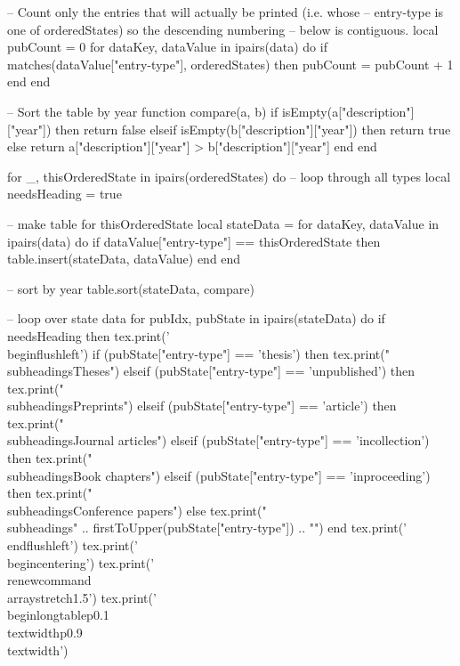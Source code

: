 \documentclass[letterpaper, 10pt]{article}
\newcommand{\subheadings}[1]{\textbf{#1} \vspace{5pt}}
\begin{document}
\begin{luacode}
		-- Count only the entries that will actually be printed (i.e. whose
		-- entry-type is one of orderedStates) so the descending numbering
		-- below is contiguous.
		local pubCount = 0
		for dataKey, dataValue in ipairs(data) do
			if matches(dataValue["entry-type"], orderedStates) then
				pubCount = pubCount + 1
			end
		end

		-- Sort the table by year
		function compare(a, b)
			if isEmpty(a["description"]["year"]) then
				return false
			elseif isEmpty(b["description"]["year"]) then
				return true
			else
				return a["description"]["year"] > b["description"]["year"]
			end
		end

		for _, thisOrderedState in ipairs(orderedStates) do 											-- loop through all types
			local needsHeading = true

			-- make table for thisOrderedState
			local stateData = {}
			for dataKey, dataValue in ipairs(data) do
				if dataValue["entry-type"] == thisOrderedState then
					table.insert(stateData, dataValue)
				end
			end

			-- sort by year
			table.sort(stateData, compare)

			-- loop over state data
			for pubIdx, pubState in ipairs(stateData) do
				if needsHeading then
					tex.print('\\begin{flushleft}')
					if (pubState["entry-type"] == 'thesis') then
						tex.print("\\subheadings{Theses}")
					elseif (pubState["entry-type"] == 'unpublished') then
						tex.print("\\subheadings{Preprints}")
					elseif (pubState["entry-type"] == 'article') then
						tex.print("\\subheadings{Journal articles}")
					elseif (pubState["entry-type"] == 'incollection') then
						tex.print("\\subheadings{Book chapters}")
					elseif (pubState["entry-type"] == 'inproceeding') then
						tex.print("\\subheadings{Conference papers}")
					else
						tex.print("\\subheadings{" .. firstToUpper(pubState["entry-type"]) .. "}")
					end
					tex.print('\\end{flushleft}')
					tex.print('\\begin{centering}')
					tex.print('\\renewcommand{\\arraystretch}{1.5}')
					tex.print('\\begin{longtable}{p{0.1\\textwidth}p{0.9\\textwidth}}')


\end{luacode}
\end{document}
